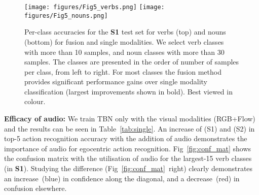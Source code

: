 \documentclass[10pt,twocolumn,letterpaper]{article}
\begin{document}
\begin{figure*}[t]
	\centering
	\texttt{[image: figures/Fig5\_verbs.png]}	\texttt{[image: figures/Fig5\_nouns.png]}
	\caption{Per-class accuracies for the \textbf{S1} test set for verbs (top) and nouns (bottom) for fusion and single modalities. We  select verb classes with more than 10 samples, and noun classes with more than 30 samples. The classes are presented in the order of number of samples per class, from left to right. For most classes the fusion method provides significant performance gains over single modality classification (largest improvements shown in bold).
	Best viewed in colour.}
	\label{fig:perclass}
\end{figure*}

\noindent \textbf{Efficacy of audio:} We train
TBN only with the visual modalities (RGB+Flow) and the results can be seen in Table~\ref{tab:single}. An increase of   (S1) and  (S2) in
top-5 action recognition accuracy with the addition of audio demonstrates
the importance of audio for egocentric action recognition. 
Fig~\ref{fig:conf_mat} shows the confusion matrix with the utilisation of audio for
the largest-15 verb classes (in \textbf{S1}). Studying the difference (Fig~\ref{fig:conf_mat}~right) clearly demonstrates an increase~(blue) in confidence along the diagonal, and a decrease~(red) in confusion
elsewhere.
\end{document}
